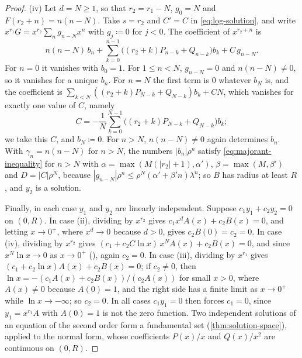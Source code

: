 \begin{proof}
(iv) Let $d=N\ge1$, so that $r_2=r_1-N$, $g_0=N$ and $F(r_2+n)=n(n-N)$. Take $s=r_2$ and $C'=C$ in \eqref{eq:log-solution}, and write $x^{r_1}G=x^{r_2}\sum_ng_{n-N}x^n$ with $g_j\coloneqq0$ for $j<0$. The coefficient of $x^{r_2+n}$ is
\[
n(n-N)\,b_n+\sum_{k=0}^{n-1}\bigl((r_2+k)P_{n-k}+Q_{n-k}\bigr)b_k+C\,g_{n-N}.
\]
For $n=0$ it vanishes with $b_0=1$. For $1\le n<N$, $g_{n-N}=0$ and $n(n-N)\ne0$, so it vanishes for a unique $b_n$. For $n=N$ the first term is $0$ whatever $b_N$ is, and the coefficient is $\sum_{k<N}((r_2+k)P_{N-k}+Q_{N-k})b_k+CN$, which vanishes for exactly one value of $C$, namely
\[
C=-\frac1N\sum_{k=0}^{N-1}\bigl((r_2+k)P_{N-k}+Q_{N-k}\bigr)b_k ;
\]
we take this $C$, and $b_N\coloneqq0$. For $n>N$, $n(n-N)\ne0$ again determines $b_n$. With $\gamma_n=n(n-N)$ for $n>N$, the numbers $|b_n|\rho^n$ satisfy \eqref{eq:majorant-inequality} for $n>N$ with $\alpha=\max(M(|r_2|+1),\alpha')$, $\beta=\max(M,\beta')$ and $D=|C|\rho^N$, because $|g_{n-N}|\rho^n\le\rho^N(\alpha'+\beta'n)\lambda^n$; so $B$ has radius at least $R$, and $y_2$ is a solution.

Finally, in each case $y_1$ and $y_2$ are linearly independent. Suppose $c_1y_1+c_2y_2=0$ on $(0,R)$. In case (ii), dividing by $x^{r_2}$ gives $c_1x^dA(x)+c_2B(x)=0$, and letting $x\to0^+$, where $x^d\to0$ because $d>0$, gives $c_2B(0)=c_2=0$. In case (iv), dividing by $x^{r_2}$ gives $(c_1+c_2C\ln x)\,x^NA(x)+c_2B(x)=0$, and since $x^N\ln x\to0$ as $x\to0^+$ (), again $c_2=0$. In case (iii), dividing by $x^{r_1}$ gives $(c_1+c_2\ln x)A(x)+c_2B(x)=0$; if $c_2\ne0$, then $\ln x=-(c_1A(x)+c_2B(x))/(c_2A(x))$ for small $x>0$, where $A(x)\ne0$ because $A(0)=1$, and the right side has a finite limit as $x\to0^+$ while $\ln x\to-\infty$; so $c_2=0$. In all cases $c_1y_1=0$ then forces $c_1=0$, since $y_1=x^{r_1}A$ with $A(0)=1$ is not the zero function. Two independent solutions of an equation of the second order form a fundamental set (\cref{thm:solution-space}), applied to the normal form, whose coefficients $P(x)/x$ and $Q(x)/x^2$ are continuous on $(0,R)$.
\end{proof}


